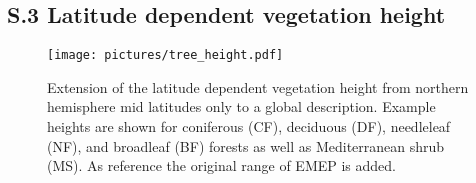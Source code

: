 \documentclass[manuscript]{copernicus}
\begin{document}

\subsection*{S.3 Latitude dependent vegetation height}
\begin{figure}[!htbp]
  \centering
  \texttt{[image: pictures/tree\_height.pdf]}
  \caption{Extension of the latitude dependent vegetation height from northern hemisphere mid latitudes only to a global description. Example heights are shown for coniferous (CF), deciduous (DF), needleleaf (NF), and broadleaf (BF) forests as well as Mediterranean shrub (MS). As reference the original range of EMEP is added.}
\end{figure}
\end{document}
